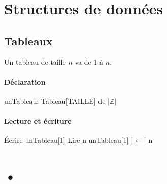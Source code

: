 \documentclass[10pt,a4paper,french]{article}
\begin{document}
\section{Structures de données}

\subsection{Tableaux}

Un tableau de taille $n$ va de 1 à $n$.

\paragraph{Déclaration}
\begin{exalgo}
unTableau: Tableau[TAILLE] de |$\mathbb{Z}$|
\end{exalgo}

\paragraph{Lecture et écriture}
\begin{exalgo}
Écrire unTableau[1]
Lire n
unTableau[1] |$\leftarrow$| n
\end{exalgo}

\section{•}
\end{document}

